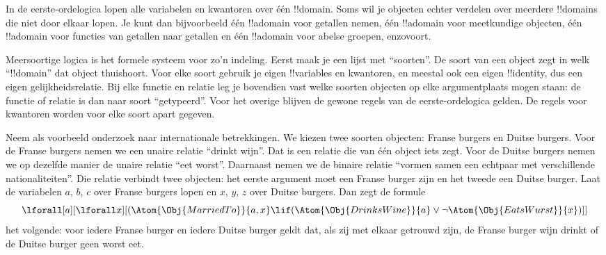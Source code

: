\documentclass[../../../include/open-logic-section]{subfiles}
\begin{document}


In de eerste-ordelogica lopen alle variabelen en kwantoren over één
!!{domain}. Soms wil je objecten echter verdelen over meerdere
!!{domain}s die niet door elkaar lopen. Je kunt dan bijvoorbeeld één
!!a{domain} voor getallen nemen, één !!a{domain} voor meetkundige
objecten, één !!a{domain} voor functies van getallen naar getallen en
één !!a{domain} voor abelse groepen, enzovoort.

Meersoortige logica is het formele systeem voor zo'n indeling. Eerst
maak je een lijst met ``soorten''. De soort van een object zegt in welk
``!!{domain}'' dat object thuishoort. Voor elke soort gebruik je eigen
!!{variable}s en kwantoren, en meestal ook een eigen !!{identity}, dus
een eigen gelijkheidsrelatie. Bij elke functie en relatie leg je
bovendien vast welke soorten objecten op elke argumentplaats mogen
staan: de functie of relatie is dan naar soort ``getypeerd''. Voor het
overige blijven de gewone regels van de eerste-ordelogica gelden. De
regels voor kwantoren worden voor elke soort apart gegeven.

Neem als voorbeeld onderzoek naar internationale betrekkingen. We
kiezen twee soorten objecten: Franse burgers en Duitse burgers. Voor
de Franse burgers nemen we een unaire relatie ``drinkt wijn''. Dat is
een relatie die van één object iets zegt. Voor de Duitse burgers nemen
we op dezelfde manier de unaire relatie ``eet worst''. Daarnaast nemen
we de binaire relatie ``vormen samen een echtpaar met verschillende
nationaliteiten''. Die relatie verbindt twee objecten: het eerste
argument moet een Franse burger zijn en het tweede een Duitse burger.
Laat de variabelen $a$, $b$, $c$ over Franse burgers lopen en $x$, $y$, $z$
over Duitse burgers. Dan zegt de formule
\[
\lforall[a][\lforall x][(\Atom{\Obj{MarriedTo}}{a,x} \lif
(\Atom{\Obj{DrinksWine}}{a} \lor \lnot \Atom{\Obj{EatsWurst}}{x})]]
\]
het volgende: voor iedere Franse burger en iedere Duitse burger geldt
dat, als zij met elkaar getrouwd zijn, de Franse burger wijn drinkt of
de Duitse burger geen worst eet.
\end{document}
